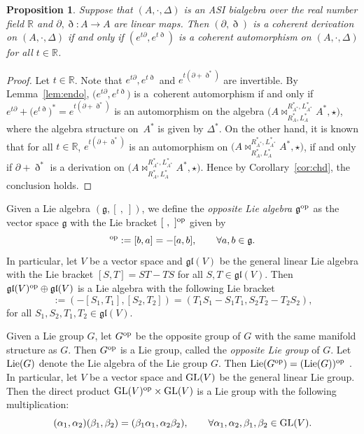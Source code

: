 \documentclass[10pt,a4paper]{amsart}
\numberwithin{equation}{section}
\newtheorem{Proposition}[Theorem]{Proposition}
{ \theoremstyle{definition}
	\newtheorem{Definition}[Theorem]{Definition}
	\newtheorem{Note}[Theorem]{Note}
	\newtheorem{Example}[Theorem]{Example}
	\newtheorem{Remark}[Theorem]{Remark} }
\begin{document}
\begin{Proposition}\label{pro:autder}
 Suppose that $(A,\cdot, \Delta)$ is an ASI bialgebra over the real number field $\mathbb{R}$ and $\partial, \eth\colon A \to A$ are linear maps.
 Then $(\partial, \eth)$ is a coherent derivation on $(A, \cdot, \Delta)$ if and only if $(e^{t\partial},e^{t\eth})$ is a coherent automorphism on $(A, \cdot, \Delta)$ for all $t \in \mathbb{R}$.
\end{Proposition}
\begin{proof}
Let $t \in \mathbb{R}$.
Note that $e^{t\partial}, e^{t\eth}$ and $e^{t (\partial + \eth^*)}$ are invertible.
By Lemma~\ref{lem:endo}, $\big(e^{t\partial}, e^{t\eth}\big)$ is a~coherent automorphism if and only if $e^{t\partial} + \big(e^{t\eth}\big)^* = e^{t(\partial + \eth^*)}$ is an automorphism on the algebra $\big(A \bowtie_{R_A^*, L_A^*}^{R_{A^*}^*, L_{A^*}^*} A^*, \star\big)$, where the algebra structure on~$A^*$ is given by $\Delta^*$.
On the other hand, it is known that for all $t \in \mathbb{R}$, $e^{t (\partial + \eth^*)}$ is an automorphism on $\big(A \bowtie_{R_A^*, L_A^*}^{R_{A^*}^*, L_{A^*}^*} A^*, \star\big)$,
if and only if $\partial + \eth^*$ is a derivation on $\big(A \bowtie_{R_A^*, L_A^*}^{R_{A^*}^*, L_{A^*}^*} A^*, \star\big)$.
Hence by Corollary~\ref{cor:chd}, the conclusion holds.
\end{proof}

Given a Lie algebra $(\mathfrak{g}, [\ ,\ ])$, we define the \textit{opposite Lie algebra} $\mathfrak{g}^{\rm op}$ as the vector space $\mathfrak{g}$ with the Lie bracket $[\ ,\ ]^{\rm op}$ given by
\begin{equation*}
 [a, b]^{\rm op} := [b, a] = -[a, b], \qquad \forall a, b \in \mathfrak{g}.
\end{equation*}
In particular, let $V$ be a vector space and $\mathfrak{gl}(V)$ be the general linear Lie algebra with the Lie bracket $[S, T] = S T - T S$ for all $S, T \in \mathfrak{gl}(V)$.
Then $\mathfrak{gl}(V)^{\rm op} \oplus \mathfrak{gl}(V)$ is a Lie algebra with the following Lie bracket
\begin{equation}
 [(S_1, S_2), (T_1, T_2)] := (-[S_1, T_1], [S_2, T_2]) = (T_1 S_1 - S_1 T_1, S_2 T_2 - T_2 S_2), \label{eq:coherent}
\end{equation}
for all $S_1, S_2, T_1, T_2 \in \mathfrak{gl}(V)$.

Given a Lie group $G$, let $G^{\rm op}$ be the opposite group of
$G$ with the same manifold structure as $G$. Then $G^{\rm op}$ is
a Lie group, called the \textit{opposite Lie group} of $G$. Let
${\rm Lie}(G)$ denote the Lie algebra of the Lie group $G$. Then
${\rm Lie}(G^{\rm op}) = ({\rm Lie}(G))^{\rm op}$ \cite{nicolas1989lie}.
In particular, let $V$ be a vector space and ${\rm GL}(V)$ be the general
linear Lie group. Then the direct product ${\rm GL}(V)^{\rm op} \times
{\rm GL}(V)$ is a Lie group with the following multiplication:
\begin{equation}
 (\alpha_1, \alpha_2) (\beta_1, \beta_2) = (\beta_1 \alpha_1, \alpha_2 \beta_2), \qquad \forall \alpha_1, \alpha_2, \beta_1, \beta_2 \in {\rm GL}(V). \label{eq:coherent2}
\end{equation}
\end{document}

